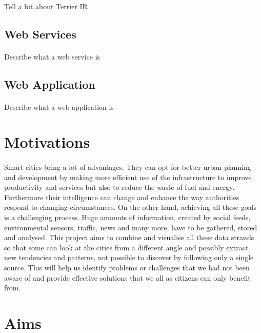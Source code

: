 \documentclass{l4proj}
\begin{document}
\paragraph{}
Tell a bit about Terrier IR

\subsection{Web Services}
\paragraph{}
Describe what a web service is

\subsection{Web Application}
\paragraph{}
Describe what a web application is

\section{Motivations}
\paragraph{}
Smart cities bring a lot of advantages. They can opt for better urban planning and development by making more efficient use of the infrastructure to improve productivity and services but also to reduce the waste of fuel and energy. Furthermore their intelligence can change and enhance the way authorities respond to changing circumstances. On the other hand, achieving all these goals is a challenging process. Huge amounts of information, created by social feeds, environmental sensors, traffic, news and many more, have to be gathered, stored and analysed. This project aims to combine and visualise all these data strands so that some can look at the cities from a different angle and possibly extract new tendencies and patterns, not possible to discover by following only a single source. This will help us identify problems or challenges that we had not been aware of and provide effective solutions that we all as citizens can only benefit from.

\section{Aims}
\end{document}
